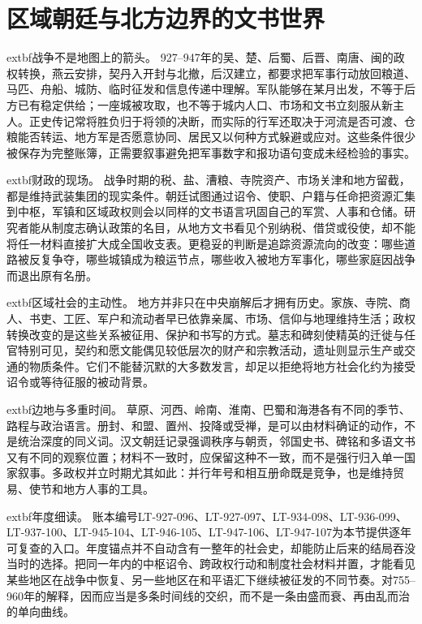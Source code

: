 \section{区域朝廷与北方边界的文书世界}
\label{sec:regional-courts-borderlands}

\noindent	extbf{战争不是地图上的箭头。} 927--947年的吴、楚、后蜀、后晋、南唐、闽的政权转换，燕云安排，契丹入开封与北撤，后汉建立，都要求把军事行动放回粮道、马匹、舟船、城防、临时征发和信息传递中理解。军队能够在某月出发，不等于后方已有稳定供给；一座城被攻取，也不等于城内人口、市场和文书立刻服从新主人。正史传记常将胜负归于将领的决断，而实际的行军还取决于河流是否可渡、仓粮能否转运、地方军是否愿意协同、居民又以何种方式躲避或应对。这些条件很少被保存为完整账簿，正需要叙事避免把军事数字和报功语句变成未经检验的事实。

\noindent	extbf{财政的现场。} 战争时期的税、盐、漕粮、寺院资产、市场关津和地方留截，都是维持武装集团的现实条件。朝廷试图通过诏令、使职、户籍与任命把资源汇集到中枢，军镇和区域政权则会以同样的文书语言巩固自己的军赏、人事和仓储。研究者能从制度志确认政策的名目，从地方文书看见个别纳税、借贷或役使，却不能将任一材料直接扩大成全国收支表。更稳妥的判断是追踪资源流向的改变：哪些道路被反复争夺，哪些城镇成为粮运节点，哪些收入被地方军事化，哪些家庭因战争而退出原有名册。

\noindent	extbf{区域社会的主动性。} 地方并非只在中央崩解后才拥有历史。家族、寺院、商人、书吏、工匠、军户和流动者早已依靠亲属、市场、信仰与地理维持生活；政权转换改变的是这些关系被征用、保护和书写的方式。墓志和碑刻使精英的迁徙与任官特别可见，契约和愿文能偶见较低层次的财产和宗教活动，遗址则显示生产或交通的物质条件。它们不能替沉默的大多数发言，却足以拒绝将地方社会化约为接受诏令或等待征服的被动背景。

\noindent	extbf{边地与多重时间。} 草原、河西、岭南、淮南、巴蜀和海港各有不同的季节、路程与政治语言。册封、和盟、置州、投降或受禅，是可以由材料确证的动作，不是统治深度的同义词。汉文朝廷记录强调秩序与朝贡，邻国史书、碑铭和多语文书又有不同的观察位置；材料不一致时，应保留这种不一致，而不是强行归入单一国家叙事。多政权并立时期尤其如此：并行年号和相互册命既是竞争，也是维持贸易、使节和地方人事的工具。

\noindent	extbf{年度细读。} 账本编号LT-927-096、LT-927-097、LT-934-098、LT-936-099、LT-937-100、LT-945-104、LT-946-105、LT-947-106、LT-947-107为本节提供逐年可复查的入口。年度锚点并不自动含有一整年的社会史，却能防止后来的结局吞没当时的选择。把同一年内的中枢诏令、跨政权行动和制度社会材料并置，才能看见某些地区在战争中恢复、另一些地区在和平语汇下继续被征发的不同节奏。对755--960年的解释，因而应当是多条时间线的交织，而不是一条由盛而衰、再由乱而治的单向曲线。

